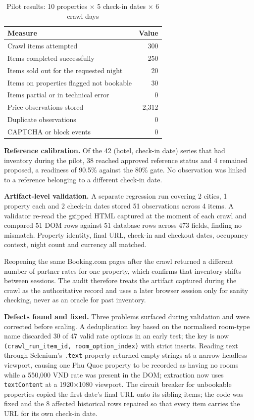 \begin{table}[H]
\centering
\caption{Pilot results: 10 properties $\times$ 5 check-in dates $\times$ 6 crawl days}
\label{tab:pilot}
\begin{tabular}{|l|r|}
\hline
\textbf{Measure} & \textbf{Value} \\
\hline
Crawl items attempted & 300 \\
Items completed successfully & 250 \\
Items sold out for the requested night & 20 \\
Items on properties flagged not bookable & 30 \\
Items partial or in technical error & 0 \\
Price observations stored & 2{,}312 \\
Duplicate observations & 0 \\
CAPTCHA or block events & 0 \\
\hline
\end{tabular}
\end{table}

\textbf{Reference calibration.} Of the 42 (hotel, check-in date) series that had inventory during the pilot, 38 reached approved reference status and 4 remained proposed, a readiness of 90.5\% against the 80\% gate. No observation was linked to a reference belonging to a different check-in date.

\textbf{Artifact-level validation.} A separate regression run covering 2 cities, 1 property each and 2 check-in dates stored 51 observations across 4 items. A validator re-read the gzipped HTML captured at the moment of each crawl and compared 51 DOM rows against 51 database rows across 473 fields, finding no mismatch. Property identity, final URL, check-in and checkout dates, occupancy context, night count and currency all matched.

Reopening the same Booking.com pages after the crawl returned a different number of partner rates for one property, which confirms that inventory shifts between sessions. The audit therefore treats the artifact captured during the crawl as the authoritative record and uses a later browser session only for sanity checking, never as an oracle for past inventory.

\textbf{Defects found and fixed.} Three problems surfaced during validation and were corrected before scaling. A deduplication key based on the normalised room-type name discarded 30 of 47 valid rate options in an early test; the key is now \texttt{(crawl\_run\_item\_id, room\_option\_index)} with strict inserts. Reading text through Selenium's \texttt{.text} property returned empty strings at a narrow headless viewport, causing one Phu Quoc property to be recorded as having no rooms while a 550,000 VND rate was present in the DOM; extraction now uses \texttt{textContent} at a 1920$\times$1080 viewport. The circuit breaker for unbookable properties copied the first date's final URL onto its sibling items; the code was fixed and the 8 affected historical rows repaired so that every item carries the URL for its own check-in date.

